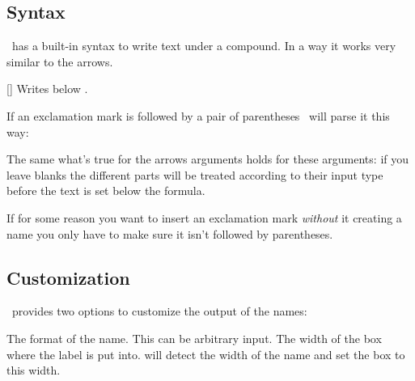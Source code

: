 \documentclass[load-preamble+]{cnltx-doc}
\begin{document}
\subsection{Syntax}
\chemformula\ has a built-in syntax to write text under a compound.  In a way
it works very similar to the arrows.
\begin{commands}
  []
    Writes  below .
\end{commands}
If an exclamation mark is followed by a pair of parentheses \chemformula\ will
parse it this way:
\begin{example}
\end{example}
The same what's true for the arrows arguments holds for these arguments: if
you leave blanks the different parts will be treated according to their input
type before the text is set below the formula.
\begin{example}
   \quad
   \quad
   \quad
   \quad
\end{example}
If for some reason you want to insert an exclamation mark \emph{without} it
creating a name you only have to make sure it isn't followed by parentheses.
\begin{example}
   \par
\end{example}

\subsection{Customization}
\chemformula\ provides two options to customize the output of the names:
\begin{options}
   The format of the name.  This can be arbitrary input.
   The width of the box where the label is put into.   will detect
   the width of the name and set the box to this width.
\end{options}
\begin{example}
   \par
   \par
   \par
\end{example}
\end{document}
